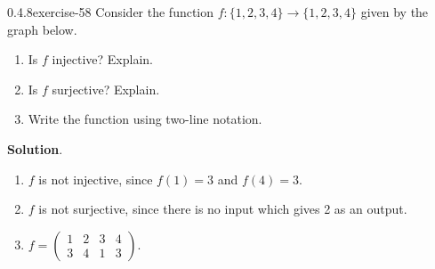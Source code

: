 \documentclass[twoside,11pt,]{book}
\numberwithin{equation}{chapter}
\newcommand{\amp}{&}
\begin{document}
\begin{divisionsolution}{0.4.8}{}{exercise-58}%
\hypertarget{p-1000}{}%
Consider the function \(f:\{1,2,3,4\} \to \{1,2,3,4\}\) given by the graph below.%
\begin{sidebyside}{1}{0.3}{0.3}{0}%
\begin{sbspanel}{0.4}%
\end{sbspanel}%
\end{sidebyside}%
\par
\hypertarget{p-1001}{}%
\leavevmode%
\begin{enumerate}[label=(\alph*)]
\item\hypertarget{li-845}{}\hypertarget{p-1002}{}%
Is \(f\) injective? Explain.%
\item\hypertarget{li-846}{}\hypertarget{p-1003}{}%
Is \(f\) surjective? Explain.%
\item\hypertarget{li-847}{}\hypertarget{p-1004}{}%
Write the function using two-line notation.%
\end{enumerate}
%
\par\smallskip%
\noindent\textbf{Solution}.\quad%
\hypertarget{p-1005}{}%
\leavevmode%
\begin{enumerate}[label=(\alph*)]
\item\hypertarget{li-848}{}\hypertarget{p-1006}{}%
\(f\) is not injective, since \(f(1) = 3\) and \(f(4) = 3\).%
\item\hypertarget{li-849}{}\hypertarget{p-1007}{}%
\(f\) is not surjective, since there is no input which gives 2 as an output.%
\item\hypertarget{li-850}{}\hypertarget{p-1008}{}%
\(f=\begin{pmatrix} 1 \amp 2 \amp 3 \amp 4 \\ 3 \amp 4 \amp 1 \amp 3\end{pmatrix}\).%
\end{enumerate}
%
\end{divisionsolution}%
\end{document}
